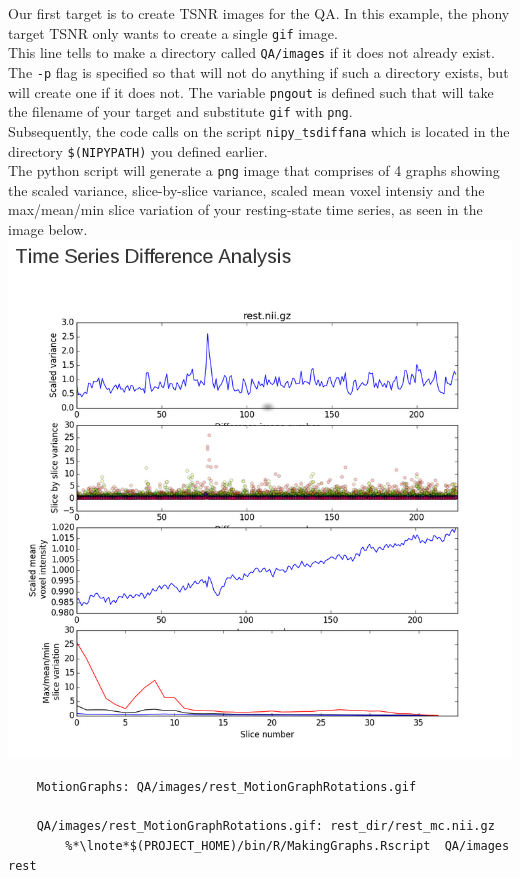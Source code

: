 \noindent{} Our first target is to create TSNR images for the QA. In this example, the phony target TSNR only wants \maken{} to create a single \texttt{gif} image. \\
 This line tells \maken{} to make a directory called \texttt{QA/images} if it does not already exist. The \texttt{-p} flag is specified so that \maken{} will not do anything if such a directory exists, but will create one if it does not. 
 The variable \texttt{pngout} is defined such that \maken{} will take the filename of your target and substitute \texttt{gif} with \texttt{png}.\\
 Subsequently, the code calls on the script \texttt{nipy\_tsdiffana} which is located in the directory \texttt{\$(NIPYPATH)} you defined earlier.\\ The python script will generate a \texttt{png} image that comprises of 4 graphs showing the scaled variance, slice-by-slice variance, scaled mean voxel intensiy and the max/mean/min slice variation of your resting-state time series, as seen in the image below. \\

\includegraphics[scale=0.5]{QAtsdiffana.png}

\begin{lstlisting}
	MotionGraphs: QA/images/rest_MotionGraphRotations.gif 

	QA/images/rest_MotionGraphRotations.gif: rest_dir/rest_mc.nii.gz
		%*\lnote*$(PROJECT_HOME)/bin/R/MakingGraphs.Rscript  QA/images rest
\end{lstlisting}

